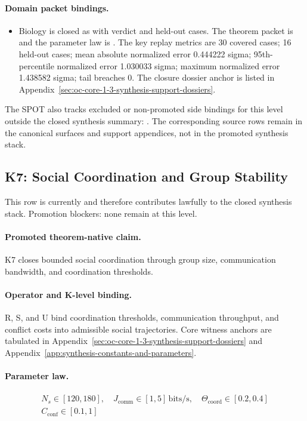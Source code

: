\paragraph{Domain packet bindings.}
\begin{itemize}[leftmargin=1.6em,nosep]
\item Biology is closed as  with verdict  and  held-out cases. The theorem packet is  and the parameter law is . The key replay metrics are 30 covered cases; 16 held-out cases; mean absolute normalized error 0.444222 sigma; 95th-percentile normalized error 1.030033 sigma; maximum normalized error 1.438582 sigma; tail breaches 0. The closure dossier anchor is listed in Appendix~\ref{sec:oc-core-1-3-synthesis-support-dossiers}.
\end{itemize}
The SPOT also tracks  excluded or non-promoted side bindings for this level outside the closed synthesis summary: . The corresponding source rows remain in the canonical surfaces and support appendices, not in the promoted synthesis stack.

\subsection{K7: Social Coordination and Group Stability}
\label{sec:oc-core-1-3-synthesis-k7}
This row is currently  and therefore contributes lawfully to the closed synthesis stack.
Promotion blockers: none remain at this level.

\paragraph{Promoted theorem-native claim.}
K7 closes bounded social coordination through group size, communication bandwidth, and coordination thresholds.

\paragraph{Operator and K-level binding.}
R, S, and U bind coordination thresholds, communication throughput, and conflict costs into admissible social trajectories.
Core witness anchors are tabulated in Appendix~\ref{sec:oc-core-1-3-synthesis-support-dossiers} and Appendix~\ref{app:synthesis-constants-and-parameters}.

\paragraph{Parameter law.}
\[
\begin{gathered} N_s \in [120,180],\quad J_{\mathrm{comm}} \in [1,5]\,\mathrm{bits/s},\quad \Theta_{\mathrm{coord}} \in [0.2,0.4] \\ C_{\mathrm{conf}} \in [0.1,1] \end{gathered}
\]

